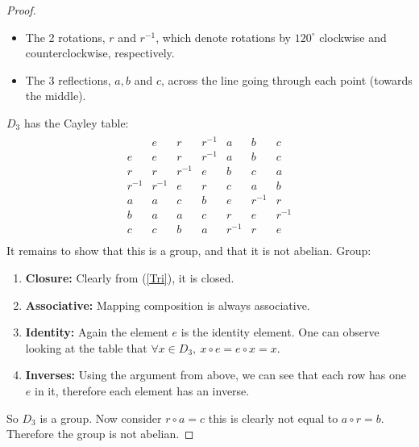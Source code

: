 \documentclass[a4paper,12pt]{extarticle}
\theoremstyle{definition}
\begin{document}
\begin{itemize}
\begin{proof}
\begin{itemize}
        \item The 2 rotations, $r$ and $r^{-1}$, which denote rotations by $120^{\circ}$ clockwise and counterclockwise, respectively.
        \item The 3 reflections, $a,b$ and $c$, across the line going through each point (towards the middle).
    \end{itemize}
    $D_3$ has the Cayley table:\begin{align}\begin{array}{c|cccccc}\label{Tri}
      & e     & r     & r^{-1}   & a     & b   & c \\
\hline
e     & e     & r     & r^{-1}   & a     & b   & c \\
r     & r     & r^{-1}   & e     & b   & c & a     \\
r^{-1}   & r^{-1}   & e     & r     & c & a     & b   \\
a    & a     & c & b   & e     & r^{-1}   & r     \\
b   & a   & a     & c & r     & e     & r^{-1}   \\
c & c & b   & a     & r^{-1}   & r     & e     \\
\end{array}\end{align}It remains to show that this is a group, and that it is not abelian. Group:\begin{enumerate}
    \item \textbf{Closure:} Clearly from (\ref{Tri}), it is closed.
    \item \textbf{Associative:} Mapping composition is always associative.
    \item \textbf{Identity:} Again the element $e$ is the identity element. One can observe looking at the table that $\forall x\in D_3,\ x\circ e=e\circ x=x$.
    \item \textbf{Inverses:} Using the argument from above, we can see that each row has one $e$ in it, therefore each element has an inverse.
\end{enumerate}So $D_3$ is a group. Now consider $r\circ a=c$ this is clearly not equal to $a\circ r=b$. Therefore the group is not abelian.
    \end{proof}
\end{itemize}
\end{document}
